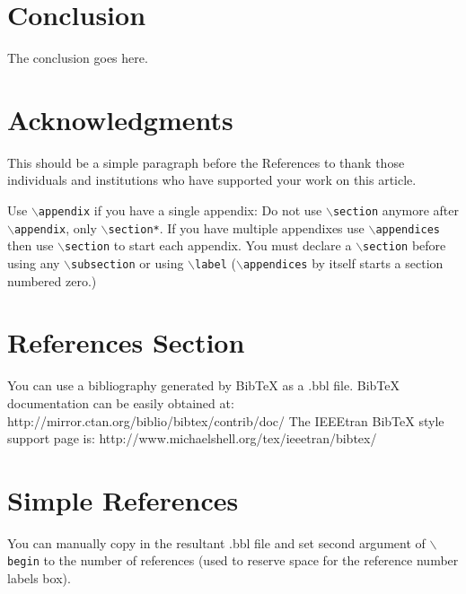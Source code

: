 \section{Conclusion}
The conclusion goes here.


\section*{Acknowledgments}
This should be a simple paragraph before the References to thank those individuals and institutions who have supported your work on this article.



{
Use $\backslash${\tt{appendix}} if you have a single appendix:
Do not use $\backslash${\tt{section}} anymore after $\backslash${\tt{appendix}}, only $\backslash${\tt{section*}}.
If you have multiple appendixes use $\backslash${\tt{appendices}} then use $\backslash${\tt{section}} to start each appendix.
You must declare a $\backslash${\tt{section}} before using any $\backslash${\tt{subsection}} or using $\backslash${\tt{label}} ($\backslash${\tt{appendices}} by itself
 starts a section numbered zero.)}






\section{References Section}
You can use a bibliography generated by BibTeX as a .bbl file.
 BibTeX documentation can be easily obtained at:
 http://mirror.ctan.org/biblio/bibtex/contrib/doc/
 The IEEEtran BibTeX style support page is:
 http://www.michaelshell.org/tex/ieeetran/bibtex/
 
%
%
\section{Simple References}
You can manually copy in the resultant .bbl file and set second argument of $\backslash${\tt{begin}} to the number of references
 (used to reserve space for the reference number labels box).

